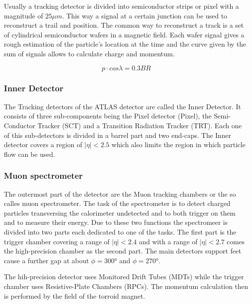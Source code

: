 Usually a tracking detector is divided into semiconductor strips or pixel with a magnitude of $25 \mu m$. This way a signal at a certain junction can be used to reconstruct a trail and position. The common way to reconstruct a track is a set of cylindrical semiconductor wafers in a magnetic field. Each wafer signal gives a rough estimation of the particle's location at the time and the curve given by the sum of signals allows to calculate charge and momentum.

\begin{equation}
p \cdot cos \lambda = 0.3 BR
\end{equation}


\subsubsection{Inner Detector}

The Tracking detectors of the ATLAS detector are called the Inner Detector. It consists of three sub-components being the Pixel detector (Pixel), the Semi-Conductor Tracker (SCT) and a Transition Radiation Tracker (TRT). Each one of this sub-detectors is divided in a barrel part and two end-caps. The Inner detector covers a region of $|\eta| < 2.5$ which also limits the region in which particle flow can be used.

\subsubsection{Muon spectrometer}

The outermost part of the detector are the Muon tracking chambers or the so calles muon spectrometer. The task of the spectrometer is to detect charged particles transversing the calorimeter undetected and to both trigger on them and to measure their energy. Due to these two functions the spectromeer is divided into two parts each dedicated to one of the tasks. The first part is the trigger chamber covering a range of $|\eta|<2.4$ and with a range of $|\eta|<2.7$ comes the high-precision chamber as the second part. The main detectors support feet cause a further gap at about $\phi = \ang{300}$ and $\phi = \ang{270}$. 

The hih-precision detector uses Monitored Drift Tubes (MDTs) while the trigger chamber uses Resistive-Plate Chambers (RPCs). The momentum calculation then is performed by the field of the torroid magnet.



